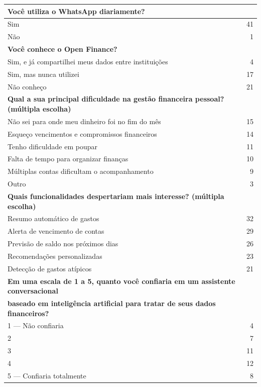 {\begin{longtable}{p{14.8cm}r}
\multicolumn{2}{l}{\textbf{Você utiliza o WhatsApp diariamente?}} \\ \midrule
Sim & 41 \\
Não & 1 \\ \midrule

\multicolumn{2}{l}{\textbf{Você conhece o Open Finance?}} \\ \midrule
Sim, e já compartilhei meus dados entre instituições & 4 \\
Sim, mas nunca utilizei & 17 \\
Não conheço & 21 \\ \midrule

\multicolumn{2}{l}{\textbf{Qual a sua principal dificuldade na gestão financeira pessoal? (múltipla escolha)}} \\ \midrule
Não sei para onde meu dinheiro foi no fim do mês & 15 \\
Esqueço vencimentos e compromissos financeiros & 14 \\
Tenho dificuldade em poupar & 11 \\
Falta de tempo para organizar finanças & 10 \\
Múltiplas contas dificultam o acompanhamento & 9 \\
Outro & 3 \\ \midrule

\multicolumn{2}{l}{\textbf{Quais funcionalidades despertariam mais interesse? (múltipla escolha)}} \\ \midrule
Resumo automático de gastos & 32 \\
Alerta de vencimento de contas & 29 \\
Previsão de saldo nos próximos dias & 26 \\
Recomendações personalizadas & 23 \\
Detecção de gastos atípicos & 21 \\ \midrule

\multicolumn{2}{l}{\textbf{Em uma escala de 1 a 5, quanto você confiaria em um assistente conversacional}} \\
\multicolumn{2}{l}{\textbf{baseado em inteligência artificial para tratar de seus dados financeiros?}} \\ \midrule
1 — Não confiaria & 4 \\
2 & 7 \\
3 & 11 \\
4 & 12 \\
5 — Confiaria totalmente & 8 \\ \midrule


\end{longtable}}
